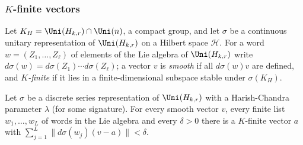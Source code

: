 \subsubsection{$K$-finite vectors}\label{sec:pf:thmS:kfin}

Let $K_H=\Uni(H_{k,r})\cap\Uni(n)$, a compact group, and let $\sigma$ be a continuous unitary representation of $\Uni(H_{k,r})$ on a
Hilbert space $\mathcal H$. For a word $w=(Z_1,\dots,Z_\ell)$ of elements of the Lie algebra of $\Uni(H_{k,r})$ write
$d\sigma(w)=d\sigma(Z_1)\cdots d\sigma(Z_\ell)$; a vector $v$ is \emph{smooth} if all $d\sigma(w)v$ are defined, and
\emph{$K$-finite} if it lies in a finite-dimensional subspace stable under $\sigma(K_H)$.

\begin{theorem}\label{pf:thmS:kfindense}
Let $\sigma$ be a discrete series representation of $\Uni(H_{k,r})$ with a Harish-Chandra parameter $\lambda$ (for some
signature). For every smooth vector $v$, every finite list $w_1,\dots,w_L$ of words in the Lie algebra and every $\delta>0$
there is a $K$-finite vector $a$ with $\sum_{j=1}^L\|d\sigma(w_j)(v-a)\|<\delta$.
\end{theorem}

